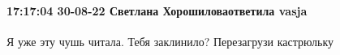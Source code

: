  
 
 
 
 

\paragraph{17:17:04 30-08-22 Светлана Хорошиловаответила vasja}

Я уже эту чушь читала. Тебя заклинило? Перезагрузи кастрюльку
